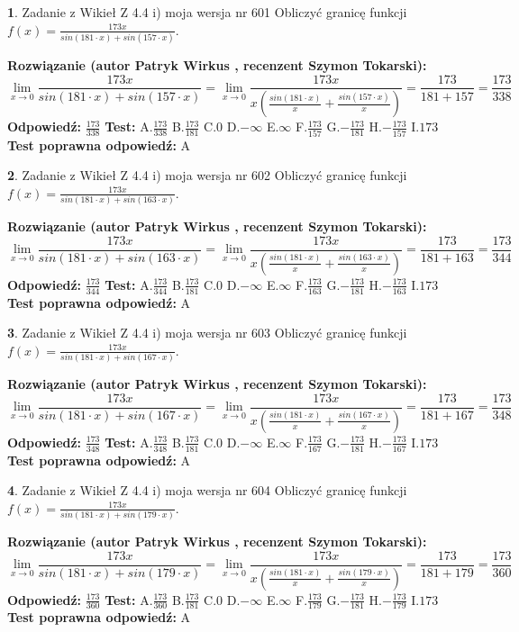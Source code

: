 \documentclass[12pt, a4paper]{article}
\theoremstyle{definition} %
\newtheorem{zad}{}
\newcommand{\zadStart}[1]{\begin{zad}#1\newline}
\newcommand{\zadStop}{\end{zad}}
\newcommand{\rozwStart}[2]{\noindent \textbf{Rozwiązanie (autor #1 , recenzent #2): }\newline}
\newcommand{\rozwStop}{\newline}
\newcommand{\odpStart}{\noindent \textbf{Odpowiedź:}\newline}
\newcommand{\odpStop}{\newline}
\newcommand{\testStart}{\noindent \textbf{Test:}\newline}
\newcommand{\testStop}{\newline}
\newcommand{\kluczStart}{\noindent \textbf{Test poprawna odpowiedź:}\newline}
\newcommand{\kluczStop}{\newline}
\begin{document}
\zadStart{Zadanie z Wikieł Z 4.4 i) moja wersja nr 601}
Obliczyć granicę funkcji $f(x)=\frac{173x}{sin(181\cdot x) +sin(157\cdot x)}$.
\zadStop
\rozwStart{Patryk Wirkus}{Szymon Tokarski}
$$\lim\limits_{x\to 0}\frac{173x}{sin(181\cdot x) +sin(157\cdot x)}=\lim\limits_{x\to 0}\frac{173x}{x(\frac{sin(181\cdot x)}{x}+\frac{sin(157\cdot x)}{x})}=\frac{173}{181+157} = \frac{173}{338}$$
\rozwStop
\odpStart
$\frac{173}{338}$
\odpStop
\testStart
A.$\frac{173}{338}$
B.$\frac{173}{181}$
C.$0$
D.$-\infty$
E.$\infty$
F.$\frac{173}{157}$
G.$-\frac{173}{181}$
H.$-\frac{173}{157}$
I.$173$
\testStop
\kluczStart
A
\kluczStop



\zadStart{Zadanie z Wikieł Z 4.4 i) moja wersja nr 602}
Obliczyć granicę funkcji $f(x)=\frac{173x}{sin(181\cdot x) +sin(163\cdot x)}$.
\zadStop
\rozwStart{Patryk Wirkus}{Szymon Tokarski}
$$\lim\limits_{x\to 0}\frac{173x}{sin(181\cdot x) +sin(163\cdot x)}=\lim\limits_{x\to 0}\frac{173x}{x(\frac{sin(181\cdot x)}{x}+\frac{sin(163\cdot x)}{x})}=\frac{173}{181+163} = \frac{173}{344}$$
\rozwStop
\odpStart
$\frac{173}{344}$
\odpStop
\testStart
A.$\frac{173}{344}$
B.$\frac{173}{181}$
C.$0$
D.$-\infty$
E.$\infty$
F.$\frac{173}{163}$
G.$-\frac{173}{181}$
H.$-\frac{173}{163}$
I.$173$
\testStop
\kluczStart
A
\kluczStop



\zadStart{Zadanie z Wikieł Z 4.4 i) moja wersja nr 603}
Obliczyć granicę funkcji $f(x)=\frac{173x}{sin(181\cdot x) +sin(167\cdot x)}$.
\zadStop
\rozwStart{Patryk Wirkus}{Szymon Tokarski}
$$\lim\limits_{x\to 0}\frac{173x}{sin(181\cdot x) +sin(167\cdot x)}=\lim\limits_{x\to 0}\frac{173x}{x(\frac{sin(181\cdot x)}{x}+\frac{sin(167\cdot x)}{x})}=\frac{173}{181+167} = \frac{173}{348}$$
\rozwStop
\odpStart
$\frac{173}{348}$
\odpStop
\testStart
A.$\frac{173}{348}$
B.$\frac{173}{181}$
C.$0$
D.$-\infty$
E.$\infty$
F.$\frac{173}{167}$
G.$-\frac{173}{181}$
H.$-\frac{173}{167}$
I.$173$
\testStop
\kluczStart
A
\kluczStop



\zadStart{Zadanie z Wikieł Z 4.4 i) moja wersja nr 604}
Obliczyć granicę funkcji $f(x)=\frac{173x}{sin(181\cdot x) +sin(179\cdot x)}$.
\zadStop
\rozwStart{Patryk Wirkus}{Szymon Tokarski}
$$\lim\limits_{x\to 0}\frac{173x}{sin(181\cdot x) +sin(179\cdot x)}=\lim\limits_{x\to 0}\frac{173x}{x(\frac{sin(181\cdot x)}{x}+\frac{sin(179\cdot x)}{x})}=\frac{173}{181+179} = \frac{173}{360}$$
\rozwStop
\odpStart
$\frac{173}{360}$
\odpStop
\testStart
A.$\frac{173}{360}$
B.$\frac{173}{181}$
C.$0$
D.$-\infty$
E.$\infty$
F.$\frac{173}{179}$
G.$-\frac{173}{181}$
H.$-\frac{173}{179}$
I.$173$
\testStop
\kluczStart
A
\kluczStop
\end{document}
